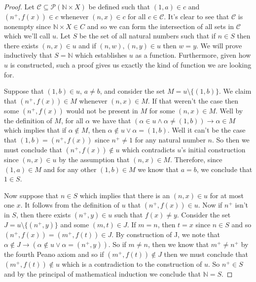 \documentclass{article}
\theoremstyle{definition}
\theoremstyle{definition}
\theoremstyle{plain}
\theoremstyle{remark}
\theoremstyle{plain}
\theoremstyle{remark}
\theoremstyle{plain}
\theoremstyle{plain}
\theoremstyle{plain}
\begin{document}
\begin{proof}
Let \( \mathcal{C} \subseteq \mathcal{P} (\mathbb{N} \times X )\) be defined such that 
\( (1, a) \in c \) and \( (n^{+}, f(x)) \in c \) whenever \( ( n, x ) \in c \) for all \( c \in \mathcal{C} \). It's clear to see that 
\( \mathcal{C} \) is nonempty since \( \mathbb{N} \times X \in C \) and so we can form the intersection of all sets in \( \mathcal{C} \) 
which we'll call \( u \). Let \( S \) be the set of all natural numbers such that if \( n \in S \) then there exists \( (n, x) \in u \) and 
if \( (n, w), (n,y) \in u\) then \( w = y \). We will prove inductively that \( S = \mathbb{N} \) which establishes \( u \) as a function.
Furthermore, given how \( u \) is constructed, such a proof gives us exactly the kind of function we are looking for. 

Suppose that \( (1, b) \in u \), \( a \neq b\), and consider the set 
\( M = u \setminus \{ (1,b) \} \).  We claim that \( (n^{+}, f(x)) \in M \) whenever \( ( n, x ) \in M \). If that weren't the case then
some \( (n^{+}, f(x)) \) would not be present in \( M \) for some \( (n,x) \in M \). Well by the definition of \( M \), for all \( \alpha \)
we have that
\( (\alpha \in u \land \alpha \neq (1,b)) \rightarrow \alpha \in M \) which implies that if \( \alpha \not\in M \), then 
\( \alpha \not\in u \lor \alpha = (1, b) \). Well  it can't be the case that \( (1,b) = (n^{+},f(x)) \) 
since \( n^{+} \neq 1 \) for any natural number \( n \). So then we must conclude that \( (n^{+}, f(x)) \not\in u \) 
which contradicts \( u \)'s initial construction since \( (n,x) \in u \) by the assumption that \( (n,x) \in M \). Therefore, 
since \((1,a) \in M \) and for any other \( (1,b) \in M \) we know that \( a = b \), we conclude that \( 1 \in S \). 

Now suppose that \( n \in S \) which implies that there is an \( (n,x) \in u \) for at most one \( x \). It follows from the definition of 
\( u \) that \( (n^{+}, f(x)) \in u \). Now if \( n^{+} \) isn't in \( S \), then there exists \( (n^{+}, y) \in u \) such that \( f(x) \neq y \).
Consider the set \( J = u \setminus \{(n^{+},y)\} \) and some \( (m, t) \in J \). If \( m = n \), then \( t = x \) since \( n \in S \) and so 
\( (n^{+}, f(x)) = (m^{+},f(t)) \in J \). By construction of J, we note that \( \alpha \not\in J \rightarrow (\alpha \not\in u \lor 
\alpha = (n^{+},y))\). So if \( m \neq n \), then we know that \( m^{+} \neq n^{+} \) by the fourth Peano axiom and so if 
\( (m^{+}, f(t)) \not\in J \) then we must conclude that \( (m^{+}, f(t)) \not\in u \) which is a contradiction to the construction of 
\( u \). So \( n^{+} \in S \) and by the principal of mathematical induction we conclude that \( \mathbb{N}  = S \). 
\end{proof}
\end{document}
